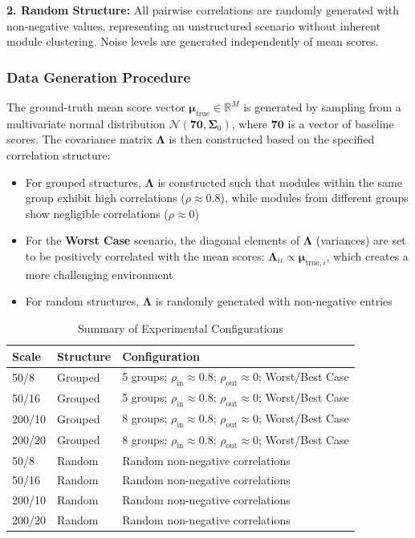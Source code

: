 \documentclass[opre,sglanonrev]{informs4}
\begin{document}
\textbf{2. Random Structure:} All pairwise correlations are randomly generated with non-negative values, representing an unstructured scenario without inherent module clustering. Noise levels are generated independently of mean scores.

\subsubsection{Data Generation Procedure}
The ground-truth mean score vector $\boldsymbol{\mu}_{\text{true}} \in \mathbb{R}^M$ is generated by sampling from a multivariate normal distribution $\mathcal{N}(\mathbf{70}, \mathbf{\Sigma}_0)$, where $\mathbf{70}$ is a vector of baseline scores. The covariance matrix $\mathbf{\Lambda}$ is then constructed based on the specified correlation structure:
\begin{itemize}
    \item For grouped structures, $\mathbf{\Lambda}$ is constructed such that modules within the same group exhibit high correlations ($\rho \approx 0.8$), while modules from different groups show negligible correlations ($\rho \approx 0$)
    \item For the \textbf{Worst Case} scenario, the diagonal elements of $\mathbf{\Lambda}$ (variances) are set to be positively correlated with the mean scores: $\mathbf{\Lambda}_{ii} \propto \boldsymbol{\mu}_{\text{true},i}$, which creates a more challenging environment
    \item For random structures, $\mathbf{\Lambda}$ is randomly generated with non-negative entries
\end{itemize}

\begin{table}[htbp]
\centering
\caption{Summary of Experimental Configurations}
\label{tab:exp_config}
\begin{tabular}{p{2cm}p{3cm}p{8cm}}
\hline
\textbf{Scale} & \textbf{Structure} & \textbf{Configuration} \\
\hline
50/8 & Grouped & 5 groups; $\rho_{\text{in}}\approx0.8$; $\rho_{\text{out}}\approx0$; Worst/Best Case \\
50/16 & Grouped & 5 groups; $\rho_{\text{in}}\approx0.8$; $\rho_{\text{out}}\approx0$; Worst/Best Case \\
200/10 & Grouped & 8 groups; $\rho_{\text{in}}\approx0.8$; $\rho_{\text{out}}\approx0$; Worst/Best Case \\
200/20 & Grouped & 8 groups; $\rho_{\text{in}}\approx0.8$; $\rho_{\text{out}}\approx0$; Worst/Best Case \\
\hline
50/8 & Random & Random non-negative correlations \\
50/16 & Random & Random non-negative correlations \\
200/10 & Random & Random non-negative correlations \\
200/20 & Random & Random non-negative correlations \\
\hline
\end{tabular}
\end{table}
\end{document}
